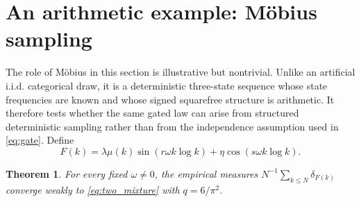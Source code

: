 \documentclass[11pt]{amsart}
\numberwithin{equation}{section}\setcounter{tocdepth}{3}\setcounter{secnumdepth}{3}
\newtheorem{theorem}{Theorem}[section]\newtheorem{proposition}[theorem]{Proposition}
\begin{document}
\section{An arithmetic example: Möbius sampling}\label{sec:arithmetic}
The role of Möbius in this section is illustrative but nontrivial.  Unlike an artificial
i.i.d. categorical draw, it is a deterministic three-state sequence whose state
frequencies are known and whose signed squarefree structure is arithmetic.  It therefore
tests whether the same gated law can arise from structured deterministic sampling rather
than from the independence assumption used in \eqref{eq:gate}.
Define
\begin{equation}F(k)=\lambda\mu(k)\sin(r\omega k\log k)+\eta\cos(s\omega k\log k).\label{eq:F}\end{equation}
\begin{theorem}\label{thm:arithmetic}
For every fixed $\omega\ne0$, the empirical measures $N^{-1}\sum_{k\le N}\delta_{F(k)}$
converge weakly to \eqref{eq:two_mixture} with $q=6/\pi^2$.
\end{theorem}
\end{document}
